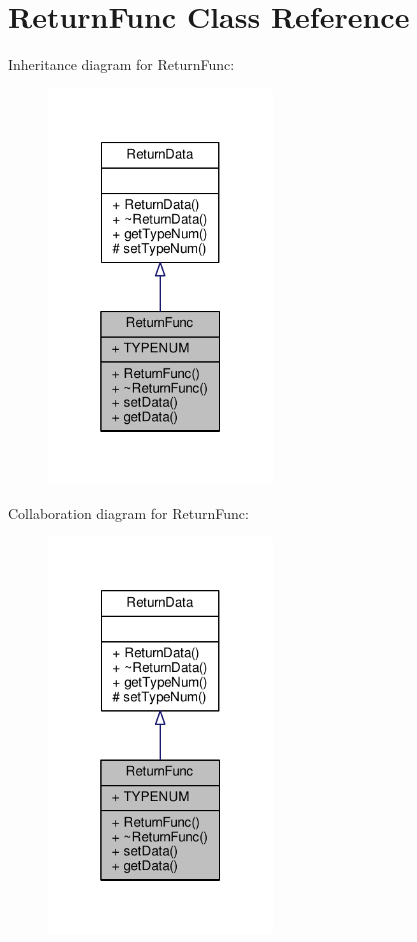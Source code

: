 \hypertarget{classReturnFunc}{}\section{Return\+Func Class Reference}
\label{classReturnFunc}


Inheritance diagram for Return\+Func\+:
\nopagebreak
\begin{figure}[H]
\begin{center}
\leavevmode
\includegraphics[width=169pt]{classReturnFunc__inherit__graph}
\end{center}
\end{figure}


Collaboration diagram for Return\+Func\+:
\nopagebreak
\begin{figure}[H]
\begin{center}
\leavevmode
\includegraphics[width=169pt]{classReturnFunc__coll__graph}
\end{center}
\end{figure}
